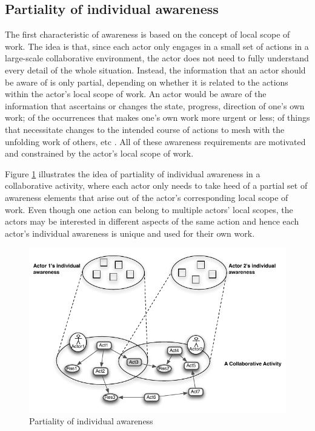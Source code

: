 \subsection{Partiality of individual awareness} %
\label{sub:partiality_of_awareness}
The first characteristic of awareness is based on the concept of local scope of work. The idea is that, since each actor only engages in a small set of actions in a large-scale collaborative environment, the actor does not need to fully understand every detail of the whole situation. Instead, the information that an actor should be aware of is only partial, depending on whether it is related to the actions within the actor's local scope of work. An actor would be aware of the information that ascertains or changes the state, progress, direction of one's own work; of the occurrences that makes one's own work more urgent or less; of things that necessitate changes to the intended course of actions to mesh with the unfolding work of others, etc \cite{schmidt2002a}. All of these awareness requirements are motivated and constrained by the actor's local scope of work.

Figure \ref{fig:partiality_of_awareness} illustrates the idea of partiality of individual awareness in a collaborative activity, where each actor only needs to take heed of a partial set of awareness elements that arise out of the actor's corresponding local scope of work. Even though one action can belong to multiple actors' local scopes, the actors may be interested in different aspects of the same action and hence each actor's individual awareness is unique and used for their own work.

\begin{figure}[htbp] %
   \centering
   \includegraphics{partiality_of_awareness.pdf} 
   \caption{Partiality of individual awareness}
   \label{fig:partiality_of_awareness}
\end{figure}


